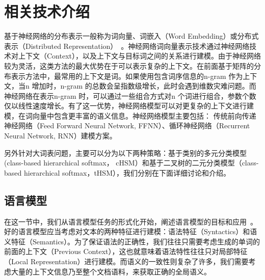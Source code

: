 \chapter{相关技术介绍}
基于神经网络的分布表示一般称为词向量、词嵌入（Word Embedding）或分布式表示（Distributed Representation）~。神经网络词向量表示技术通过神经网络技术对上下文（Context），以及上下文与目标词之间的关系进行建模。由于神经网络较为灵活，这类方法的最大优势在于可以表示复杂的上下文。在前面基于矩阵的分布表示方法中，最常用的上下文是词。如果使用包含词序信息的n-gram 作为上下文，当n 增加时，n-gram 的总数会呈指数级增长，此时会遇到维数灾难问题。而神经网络在表示n-gram 时，可以通过一些组合方式对n 个词进行组合，参数个数仅以线性速度增长。有了这一优势，神经网络模型可以对更复杂的上下文进行建模，在词向量中包含更丰富的语义信息。神经网络模型主要包括： 传统前向传递神经网络（Feed Forward Neural Network, FFNN）、循环神经网络（Recurrent Neural Network, RNN）建模方案。

另外针对大词表问题，主要可以分为以下两种策略：基于类别的多元分类模型(class-based hierarchical softmax， cHSM）和基于二叉树的二元分类模型（class-based hierarchical softmax，tHSM），我们分别在下面详细讨论和介绍。

\section{语言模型}
在这一节中，我们从语言模型任务的形式化开始，阐述语言模型的目标和应用~。好的语言模型应当考虑对文本的两种特征进行建模：语法特征（Syntactics）和语义特征（Semantics）。为了保证语法的正确性，我们往往只需要考虑生成的单词的前面的上下文（Previous Context），这也就意味着语法特性往往只对局部特征（Local Representation）进行建模。而语义的一致性则复杂了许多，我们需要考虑大量的上下文信息乃至整个文档语料，来获取正确的全局语义。


